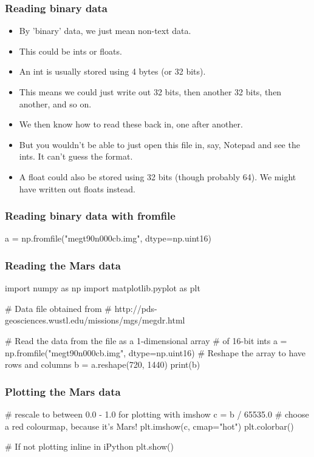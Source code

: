 \documentclass{beamer}
\begin{document}
\begin{frame}[fragile]
\frametitle{Reading binary data}
\begin{itemize}
\item By 'binary' data, we just mean non-text data. 
\item This could be ints or floats.
\item An int is usually stored using 4 bytes (or 32 bits).
\item This means we could just write out 32 bits, then another 32
  bits, then another, and so on.
\item We then know how to read these back in, one after another.
\item But you wouldn't be able to just open this file in, say, Notepad and see
  the ints. It can't guess the format.
\item A float could also be stored using 32 bits (though probably
  64). We might have written out floats instead.
\end{itemize}
\end{frame}

\begin{frame}[fragile]
\frametitle{Reading binary data with fromfile}
\begin{code}
a = np.fromfile("megt90n000cb.img", dtype=np.uint16)
\end{code}
\end{frame}

\begin{frame}[fragile]
\frametitle{Reading the Mars data}
\begin{code}
import numpy as np
import matplotlib.pyplot as plt

# Data file obtained from 
# http://pds-geosciences.wustl.edu/missions/mgs/megdr.html

# Read the data from the file as a 1-dimensional array 
# of 16-bit ints
a = np.fromfile("megt90n000cb.img", dtype=np.uint16)
# Reshape the array to have rows and columns
b = a.reshape(720, 1440)
print(b)
\end{code}
\end{frame}


\begin{frame}[fragile]
\frametitle{Plotting the Mars data}
\begin{code}
# rescale to between 0.0 - 1.0 for plotting with imshow
c = b / 65535.0
# choose a red colourmap, because it's Mars!
plt.imshow(c, cmap="hot")
plt.colorbar()

# If not plotting inline in iPython
plt.show()
\end{code}
\end{frame}
\end{document}
